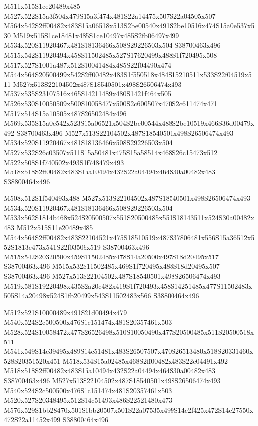 \documentclass{article}
\begin{document}
\begin{multicols}{2}
M511x515S1ce20489x485 M527x522S15a3f504x479S15a3f474x481S22a14475x507S22a04505x507 M564x542S2ff00482x483S15a06518x513S2be00540x491S2be10516x474S15a0e537x530 M519x515S1ce18481x485S1ce10497x485S2fb06497x499 M534x520S11920467x481S18136466x508S29226503x504 S38700463x496 M515x542S11920494x458S11502485x527S17620499x488S1f720495x508 M517x527S1001a487x512S10041484x485S22f04490x474 M544x564S20500499x542S2ff00482x483S1f550518x484S15210511x533S22f04519x511 M527x513S22104502x487S18540501x498S26506474x493 M537x535S23107516x465S14211489x480S1421f464x505 M526x530S10050509x500S10058477x500S2c600507x470S2c611474x471 M517x514S15a10505x487S26502484x496 M569x535S15a0e542x523S15a06521x504S2be00544x488S2be10519x466S36d00479x492 S38700463x496 M527x513S22104502x487S18540501x498S26506474x493 M534x520S11920467x481S18136466x508S29226503x504 M527x532S26c03507x511S15a50481x475S15a58514x468S26c15473x512 M522x508S1f740502x493S1f748479x493 M518x518S2ff00482x483S15a10494x432S22a04494x464S30a00482x483 S38800464x496

M508x512S1f540493x488 M527x513S22104502x487S18540501x498S26506474x493 M534x520S11920467x481S18136466x508S29226503x504 M533x562S1814b468x524S20500507x551S20500485x551S18143511x524S30a00482x483 M512x515S11e20489x485 M544x564S2ff00482x483S22104521x475S18510519x487S37806481x556S15a36512x552S1813e473x541S22f03509x519 S38700463x496 M515x542S20320500x459S11502485x478S14a20500x497S18d20495x517 S38700463x496 M515x532S11502485x469S1f720495x488S18d20495x507 S38700463x496 M527x513S22104502x487S18540501x498S26506474x493 M519x581S19220498x435S2a20c482x419S1f720493x458S14251485x477S11502483x505S14a20498x524S1fb20499x543S11502483x566 S38800464x496

M512x521S10000489x491S21d00494x479 M540x524S2c500500x476S1c151474x481S20357461x503 M528x524S10058472x477S26526498x510S10050490x477S20500485x511S20500518x511 M541x549S14c39495x489S14c51481x483S26507507x470S26513480x518S20331460x528S20351520x451 M518x534S15a02485x468S2ff00482x483S22c04491x492 M518x518S2ff00482x483S15a10494x432S22a04494x464S30a00482x483 S38700463x496 M527x513S22104502x487S18540501x498S26506474x493 M540x524S2c500500x476S1c151474x481S20357461x503 M520x527S20348495x512S14c51493x486S22521480x473 M576x529S1bb28470x501S1bb20507x501S22a07535x499S14c2f425x472S14c27550x472S22a11452x499 S38800464x496


\end{multicols}
\end{document}
